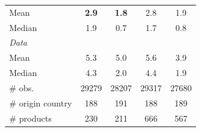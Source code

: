 \documentclass[10 pt,Helvetica, french]{beamer}
\begin{document}
\begin{frame}[label=slide_results_summary]
\begin{table}[htbp]
{\begin{center}
\begin{tabular}{l|cc|cc}
    Mean  & \bf{2.9} & \bf{1.8} & 2.8 & 1.9 \\
    Median & 1.9 & 0.7 & 1.7 & 0.8 \\ \hline
       \multicolumn{5}{l}{\textit{Data} }\\ \hline
    Mean &5.3 &5.0 & 5.6&3.9 \\
    Median  &4.3 & 2.0 &4.4 & 1.9 \\  \hline
    \# obs. & 29279 & 28207 & 29317 & 27680 \\
    \# origin country & 188 & 191 & 188 & 189 \\
    \# products & 230 & 211 & 666 & 567 \\    \hline \hline
  \end{tabular}
\end{center}}
  \end{table}%
 \end{frame}
\end{document}
